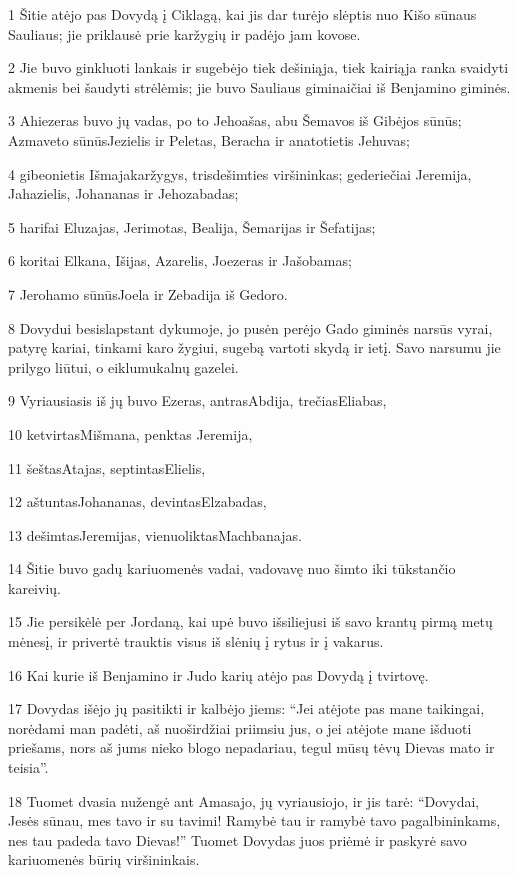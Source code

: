 \par 1 Šitie atėjo pas Dovydą į Ciklagą, kai jis dar turėjo slėptis nuo Kišo sūnaus Sauliaus; jie priklausė prie karžygių ir padėjo jam kovose. 
\par 2 Jie buvo ginkluoti lankais ir sugebėjo tiek dešiniąja, tiek kairiąja ranka svaidyti akmenis bei šaudyti strėlėmis; jie buvo Sauliaus giminaičiai iš Benjamino giminės. 
\par 3 Ahiezeras buvo jų vadas, po to Jehoašas, abu Šemavos iš Gibėjos sūnūs; Azmaveto sūnūs­Jezielis ir Peletas, Beracha ir anatotietis Jehuvas; 
\par 4 gibeonietis Išmaja­karžygys, trisdešimties viršininkas; gederiečiai Jeremija, Jahazielis, Johananas ir Jehozabadas; 
\par 5 harifai Eluzajas, Jerimotas, Bealija, Šemarijas ir Šefatijas; 
\par 6 koritai Elkana, Išijas, Azarelis, Joezeras ir Jašobamas; 
\par 7 Jerohamo sūnūs­Joela ir Zebadija iš Gedoro. 
\par 8 Dovydui besislapstant dykumoje, jo pusėn perėjo Gado giminės narsūs vyrai, patyrę kariai, tinkami karo žygiui, sugebą vartoti skydą ir ietį. Savo narsumu jie prilygo liūtui, o eiklumu­kalnų gazelei. 
\par 9 Vyriausiasis iš jų buvo Ezeras, antras­Abdija, trečias­Eliabas, 
\par 10 ketvirtas­Mišmana, penktas­ Jeremija, 
\par 11 šeštas­Atajas, septintas­Elielis, 
\par 12 aštuntas­Johananas, devintas­Elzabadas, 
\par 13 dešimtas­Jeremijas, vienuoliktas­Machbanajas. 
\par 14 Šitie buvo gadų kariuomenės vadai, vadovavę nuo šimto iki tūkstančio kareivių. 
\par 15 Jie persikėlė per Jordaną, kai upė buvo išsiliejusi iš savo krantų pirmą metų mėnesį, ir privertė trauktis visus iš slėnių į rytus ir į vakarus. 
\par 16 Kai kurie iš Benjamino ir Judo karių atėjo pas Dovydą į tvirtovę. 
\par 17 Dovydas išėjo jų pasitikti ir kalbėjo jiems: “Jei atėjote pas mane taikingai, norėdami man padėti, aš nuoširdžiai priimsiu jus, o jei atėjote mane išduoti priešams, nors aš jums nieko blogo nepadariau, tegul mūsų tėvų Dievas mato ir teisia”. 
\par 18 Tuomet dvasia nužengė ant Amasajo, jų vyriausiojo, ir jis tarė: “Dovydai, Jesės sūnau, mes tavo ir su tavimi! Ramybė tau ir ramybė tavo pagalbininkams, nes tau padeda tavo Dievas!” Tuomet Dovydas juos priėmė ir paskyrė savo kariuomenės būrių viršininkais. 
